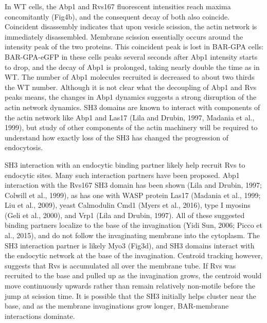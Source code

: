 \documentclass[9pt,lineno]{elife}
\begin{document}
In WT cells, the Abp1 and Rvs167 fluorescent intensities reach maxima concomitantly (Fig4b), and the consequent decay of both also coincide. Coincident disassembly indicates that upon vesicle scission, the actin network is immediately disassembled. Membrane scission essentially occurs around the intensity peak of the two proteins. This coincident peak is lost in BAR-GPA cells: BAR-GPA-eGFP in these cells peaks several seconds after Abp1 intensity starts to drop, and the decay of Abp1 is prolonged, taking nearly double the time as in WT. The number of Abp1 molecules recruited is decreased to about two thirds the WT number. Although it is not clear what the decoupling of Abp1 and Rvs peaks means, the changes in Abp1 dynamics suggests a strong disruption of the actin network dynamics. SH3 domains are known to interact with components of the actin network like Abp1 and Las17 (Lila and Drubin, 1997, Madania et al., 1999), but study of other components of the actin machinery will be required to understand how exactly loss of the SH3 has changed the progression of endocytosis.

SH3 interaction with an endocytic binding partner likely help recruit Rvs to endocytic sites. Many such interaction partners have been proposed. Abp1 interaction with the Rvs167 SH3 domain has been shown (Lila and Drubin, 1997; Colwill et al., 1999), as has one with WASP protein Las17 (Madania et al., 1999; Liu et al., 2009), yeast Calmodulin Cmd1 (Myers et al., 2016), type I myosins (Geli et al., 2000), and Vrp1 (Lila and Drubin, 1997). All of these suggested binding partners localize to the base of the invagination (Yidi Sun, 2006; Picco et al., 2015), and do not follow the invaginating membrane into the cytoplasm. The SH3 interaction partner is likely Myo3 (Fig3d), and SH3 domains interact with the endocytic network at the base of the invagination. Centroid tracking however, suggests that Rvs is accumulated all over the membrane tube. If Rvs was recruited to the base and pulled up as the invagination grows, the centroid would move continuously upwards rather than remain relatively non-motile before the jump at scission time. It is possible that the SH3 initially helps cluster near the base, and as the membrane invaginations grow longer, BAR-membrane interactions dominate.
\end{document}
